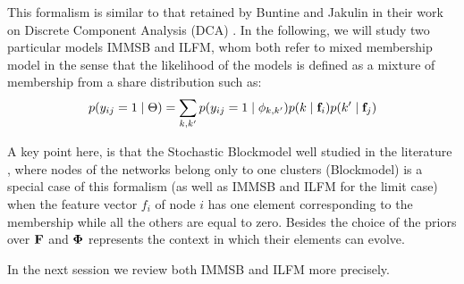 This formalism is similar to that retained by Buntine and Jakulin in their work on Discrete Component Analysis (DCA) \cite{DCA}. In the following,  we will study two particular models IMMSB and ILFM, whom both refer to mixed membership model in the sense that the likelihood of the models is defined as a mixture of membership from a share distribution such as:
\begin{equation}
p(y_{ij}=1 \mid \Theta ) = \sum_{k, k'} p(y_{ij}=1\mid\phi_{k,k'}) p(k \mid \mathbf{f}_i) p(k' \mid \mathbf{f}_j)
\end{equation}

A key point here, is that the Stochastic Blockmodel well studied in the literature \cite{goldenberg2010survey}, where nodes of the networks belong only to one clusters (Blockmodel) is a special case of this formalism (as well as IMMSB and ILFM for the limit case) when the feature vector $f_i$ of node $i$ has one element corresponding to the membership while all the others are equal to zero. Besides the choice of the priors over $\mathbf{F}$ and $\mathbf{\Phi}$ represents the context in which  their elements can evolve.

In the next session we review both IMMSB and ILFM more precisely.

